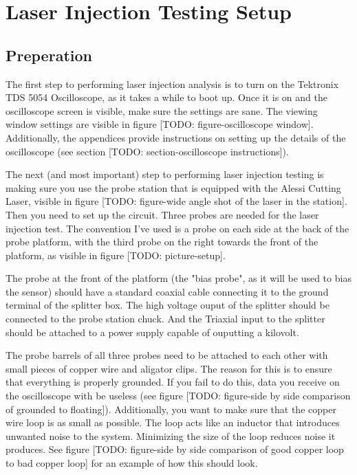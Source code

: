 \documentclass{report}
\begin{document}
    \chapter{ Laser Injection Testing Setup } \label{sect:methods}
        \section{ Preperation }
            The first step to performing laser injection analysis is to turn on the Tektronix TDS 5054 Oscilloscope, as it takes a while to boot up. Once it is on and the oscilloscope screen is visible, make sure the settings are sane. The viewing window settings are visible in figure [TODO: figure-oscilloscope window]. Additionally, the appendices provide instructions on setting up the details of the oscilloscope (see section [TODO: section-oscilloscope instructions]).

            The next (and most important) step to performing laser injection testing is making sure you use the probe station that is equipped with the Alessi Cutting Laser, visible in figure [TODO: figure-wide angle shot of the laser in the station]. Then you need to set up the circuit. Three probes are needed for the laser injection test. The convention I've used is a probe on each side at the back of the probe platform, with the third probe on the right towards the front of the platform, as visible in figure [TODO: picture-setup].

            The probe at the front of the platform (the "bias probe", as it will be used to bias the sensor) should have a standard coaxial cable connecting it to the ground terminal of the splitter box. The high voltage ouput of the splitter should be connected to the probe station chuck. And the Triaxial input to the splitter should be attached to a power supply capable of ouputting a kilovolt. 
            
            The probe barrels of all three probes need to be attached to each other with small pieces of copper wire and aligator clips. The reason for this is to ensure that everything is properly grounded. If you fail to do this, data you receive on the oscilloscope with be useless (see figure [TODO: figure-side by side comparison of grounded to floating]). Additionally, you want to make sure that the copper wire loop is as small as possible. The loop acts like an inductor that introduces unwanted noise to the system. Minimizing the size of the loop reduces noise it produces. See figure [TODO: figure-side by side comparison of good copper loop to bad copper loop] for an example of how this should look.
\end{document}
